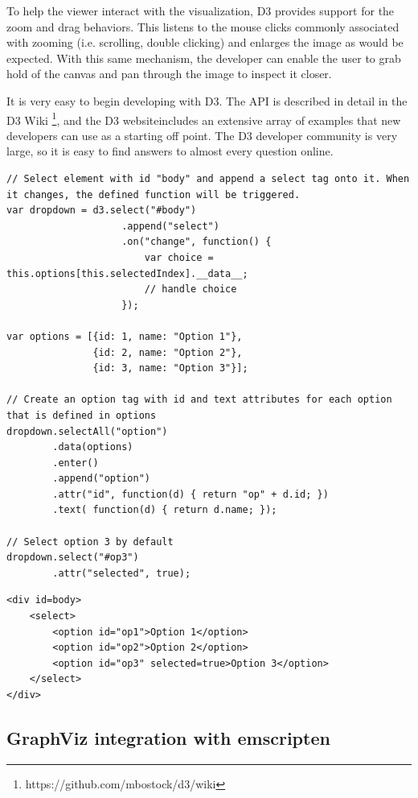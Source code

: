 To help the viewer interact with the visualization, D3 provides support for the zoom and drag behaviors. This listens to the mouse clicks commonly associated with zooming (i.e. scrolling, double clicking) and enlarges the image as would be expected. With this same mechanism, the developer can enable the user to grab hold of the canvas and pan through the image to inspect it closer.

It is very easy to begin developing with D3. The API is described in detail in the D3 Wiki \footnote{https://github.com/mbostock/d3/wiki}, and the D3 website\footnotemark[3] includes an extensive array of examples that new developers can use as a starting off point. The D3 developer community is very large, so it is easy to find answers to almost every question online. 

\lstset{language=Java}
\begin{lstlisting}[caption=Dynamically create a dropdown menu.,label=d3Example]
// Select element with id "body" and append a select tag onto it. When it changes, the defined function will be triggered.
var dropdown = d3.select("#body")
				   	.append("select")
				   	.on("change", function() {
				   		var choice = this.options[this.selectedIndex].__data__;
				   		// handle choice
				   	});

var options = [{id: 1, name: "Option 1"},
			   {id: 2, name: "Option 2"},
			   {id: 3, name: "Option 3"}];

// Create an option tag with id and text attributes for each option that is defined in options
dropdown.selectAll("option")
		.data(options)
		.enter()
		.append("option")
		.attr("id", function(d) { return "op" + d.id; })
		.text( function(d) { return d.name; });

// Select option 3 by default
dropdown.select("#op3")
		.attr("selected", true);
\end{lstlisting} 

\lstset{language=HTML}
\begin{lstlisting}[caption=Html generated from Listing \ref{d3Example},label=d3Result]
<div id=body>
    <select>
        <option id="op1">Option 1</option>
        <option id="op2">Option 2</option>
        <option id="op3" selected=true>Option 3</option>
    </select>
</div>
\end{lstlisting}


\subsection{GraphViz integration with emscripten}

